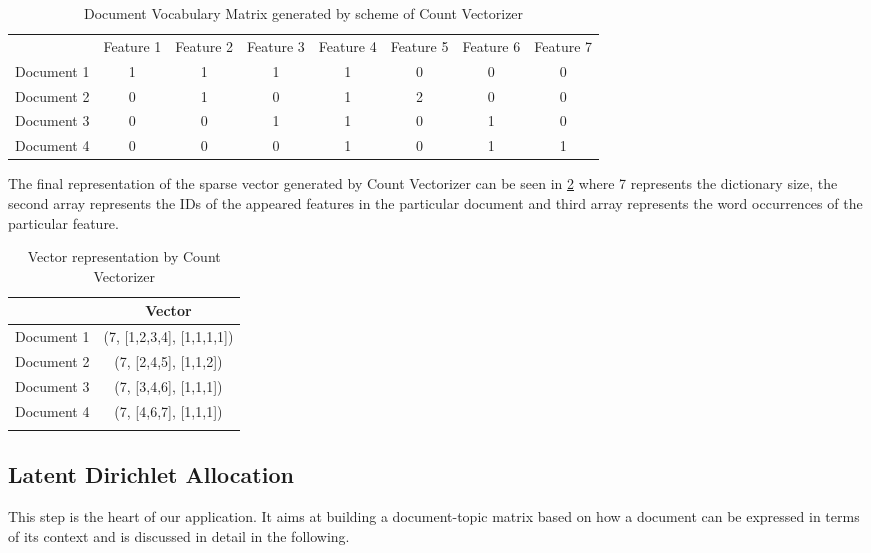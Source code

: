 \begin{table}[htbp]
	\centering
		\begin{tabular}{cccccccc}\toprule\addlinespace
			 & Feature 1 & Feature 2 & Feature 3 & Feature 4 & Feature 5 & Feature 6 & Feature 7\\\addlinespace\midrule
			Document 1 & 1 & 1 & 1 & 1 & 0 & 0 & 0 \\\addlinespace
       
			Document 2 &  0 & 1 & 0 & 1 & 2 & 0 & 0 \\\addlinespace
            
			Document 3 & 0 & 0 & 1 & 1 & 0 & 1 & 0\\\addlinespace
            
            Document 4 & 0 & 0 & 0 & 1 & 0 & 1 & 1\\
            \bottomrule
		\end{tabular}
	\caption{Document Vocabulary Matrix  generated by scheme of Count Vectorizer}
	\label{tab:Document vocabulary Matrix}
\end{table}

\par The final representation of the sparse vector generated by Count Vectorizer can be seen in \ref{tab:vector representation} where 7 represents the dictionary size, the second array represents the IDs of the appeared features in the particular document and third array represents the word occurrences of the particular feature.


\begin{table}[htbp]
	\centering
		\begin{tabular}{cc}\toprule
			  & Vector\\\midrule
		Document 1 & (7, [1,2,3,4], [1,1,1,1])\\\addlinespace 
		Document 2 &  (7, [2,4,5], [1,1,2])\\\addlinespace
		Document 3 & (7, [3,4,6], [1,1,1])\\\addlinespace
        Document 4 & (7, [4,6,7], [1,1,1])\\\addlinespace
			\bottomrule
		\end{tabular}
	\caption{Vector representation by Count Vectorizer}
	\label{tab:vector representation}
\end{table}

\subsection{Latent Dirichlet Allocation}
\label{section: lda}
This step is the heart of our application. It aims at building a document-topic matrix based on how a document can be expressed in terms of its context and is discussed in detail in the following.

